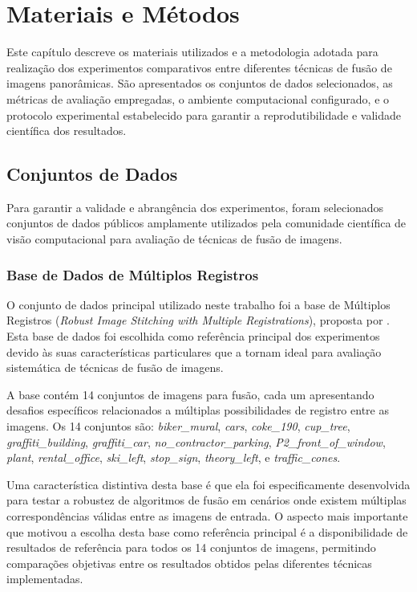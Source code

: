 \chapter{Materiais e Métodos}

Este capítulo descreve os materiais utilizados e a metodologia adotada para realização dos experimentos comparativos entre diferentes técnicas de fusão de imagens panorâmicas. São apresentados os conjuntos de dados selecionados, as métricas de avaliação empregadas, o ambiente computacional configurado, e o protocolo experimental estabelecido para garantir a reprodutibilidade e validade científica dos resultados.

\section{Conjuntos de Dados}

Para garantir a validade e abrangência dos experimentos, foram selecionados conjuntos de dados públicos amplamente utilizados pela comunidade científica de visão computacional para avaliação de técnicas de fusão de imagens.

\subsection{Base de Dados de Múltiplos Registros}

O conjunto de dados principal utilizado neste trabalho foi a base de Múltiplos Registros (\textit{Robust Image Stitching with Multiple Registrations}), proposta por \cite{zhang2018robust}. Esta base de dados foi escolhida como referência principal dos experimentos devido às suas características particulares que a tornam ideal para avaliação sistemática de técnicas de fusão de imagens.

A base contém 14 conjuntos de imagens para fusão, cada um apresentando desafios específicos relacionados a múltiplas possibilidades de registro entre as imagens. Os 14 conjuntos são: \textit{biker\_mural}, \textit{cars}, \textit{coke\_190}, \textit{cup\_tree}, \textit{graffiti\_building}, \textit{graffiti\_car}, \textit{no\_contractor\_parking}, \textit{P2\_front\_of\_window}, \textit{plant}, \textit{rental\_office}, \textit{ski\_left}, \textit{stop\_sign}, \textit{theory\_left}, e \textit{traffic\_cones}.

Uma característica distintiva desta base é que ela foi especificamente desenvolvida para testar a robustez de algoritmos de fusão em cenários onde existem múltiplas correspondências válidas entre as imagens de entrada. O aspecto mais importante que motivou a escolha desta base como referência principal é a disponibilidade de resultados de referência para todos os 14 conjuntos de imagens, permitindo comparações objetivas entre os resultados obtidos pelas diferentes técnicas implementadas.

